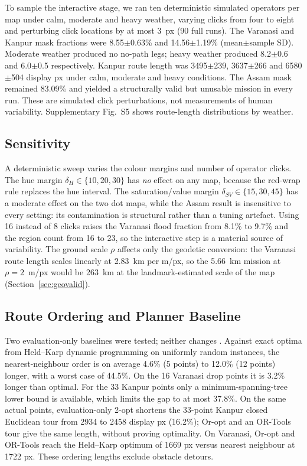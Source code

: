 To sample the interactive stage, we ran ten deterministic simulated operators per map under calm, moderate and heavy weather, varying clicks from four to eight and perturbing click locations by at most 3~px (90 full runs). The Varanasi and Kanpur mask fractions were 8.55$\pm$0.63\% and 14.56$\pm$1.19\% (mean$\pm$sample SD). Moderate weather produced no no-path legs; heavy weather produced 8.2$\pm$0.6 and 6.0$\pm$0.5 respectively. Kanpur route length was 3495$\pm$239, 3637$\pm$266 and 6580$\pm$504 display px under calm, moderate and heavy conditions. The Assam mask remained 83.09\% and yielded a structurally valid but unusable mission in every run. These are simulated click perturbations, not measurements of human variability. Supplementary Fig.~S5 shows route-length distributions by weather.

\subsection{Sensitivity}
A deterministic sweep varies the colour margins and number of operator clicks. The hue margin $\delta_H\in\{10,20,30\}$ has \emph{no} effect on any map, because the red-wrap rule replaces the hue interval. The saturation/value margin $\delta_{SV}\in\{15,30,45\}$ has a moderate effect on the two dot maps, while the Assam result is insensitive to every setting: its contamination is structural rather than a tuning artefact. Using 16 instead of 8 clicks raises the Varanasi flood fraction from 8.1\% to 9.7\% and the region count from 16 to 23, so the interactive step is a material source of variability. The ground scale $\rho$ affects only the geodetic conversion: the Varanasi route length scales linearly at 2.83~km per m/px, so the 5.66~km mission at $\rho=2$~m/px would be 263~km at the landmark-estimated scale of the map (Section~\ref{sec:geovalid}).



\subsection{Route Ordering and Planner Baseline}
\label{sec:baselines}
Two evaluation-only baselines were tested; neither changes \adapt{}. Against exact optima from Held--Karp dynamic programming \cite{held1962dynamic} on uniformly random instances, the nearest-neighbour order is on average 4.6\% (5 points) to 12.0\% (12 points) longer, with a worst case of 44.5\%. On the 16 Varanasi drop points it is 3.2\% longer than optimal. For the 33 Kanpur points only a minimum-spanning-tree lower bound is available, which limits the gap to at most 37.8\%. On the same actual points, evaluation-only 2-opt shortens the 33-point Kanpur closed Euclidean tour from 2934 to 2458 display px (16.2\%); Or-opt and an OR-Tools tour give the same length, without proving optimality. On Varanasi, Or-opt and OR-Tools reach the Held--Karp optimum of 1669 px versus nearest neighbour at 1722 px. These ordering lengths exclude obstacle detours.

